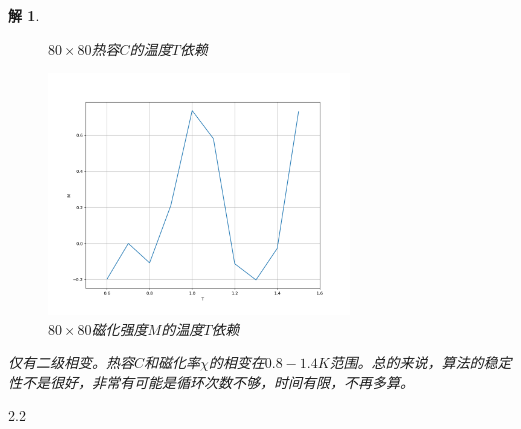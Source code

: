 \documentclass[10pt]{ctexart}
\newtheorem*{solution}{解}
\begin{document}
\begin{solution}
\begin{figure}[H]
\begin{minipage}{0.45\linewidth}
            \caption{$80\times 80$热容$C$的温度$T$依赖}
        \end{minipage}
        \qquad
        \begin{minipage}{0.45\linewidth}
            \centering
            \includegraphics[width=8cm]{M_80.png}
            \caption{$80\times 80$磁化强度$M$的温度$T$依赖}
        \end{minipage}
    \end{figure}
仅有二级相变。热容$C$和磁化率$\chi$的相变在$0.8-1.4K$范围。总的来说，算法的稳定性不是很好，非常有可能是循环次数不够，时间有限，不再多算。
\end{solution}
2.2
\end{document}
